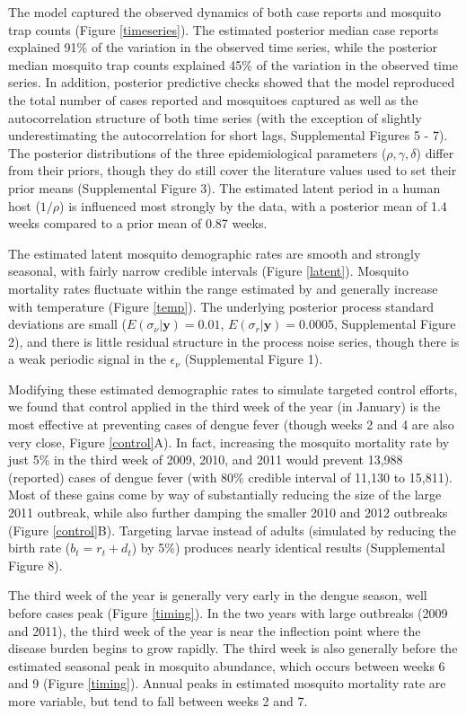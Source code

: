 \documentclass[10pt,letterpaper]{article}
\begin{document}
The model captured the observed dynamics of both case reports and mosquito trap counts (Figure \ref{timeseries}).
The estimated posterior median case reports explained 91\% of the variation in the observed time series, while the posterior median mosquito trap counts explained 45\% of the variation in the observed time series. 
In addition, posterior predictive checks showed that the model reproduced the total number of cases reported and mosquitoes captured as well as the autocorrelation structure of both time series (with the exception of slightly underestimating the autocorrelation for short lags, Supplemental Figures 5 - 7).
The posterior distributions of the three epidemiological parameters ($\rho, \gamma, \delta$) differ from their priors, though they do still cover the literature values used to set their prior means (Supplemental Figure 3).
The estimated latent period in a human host ($1/\rho$) is influenced most strongly by the data, with a posterior mean of 1.4 weeks compared to a prior mean of 0.87 weeks.

The estimated latent mosquito demographic rates are smooth and strongly seasonal, with fairly narrow credible intervals (Figure \ref{latent}).
Mosquito mortality rates fluctuate within the range estimated by \cite{Brady2013} and generally increase with temperature (Figure \ref{temp}).
The underlying posterior process standard deviations are small ($E(\sigma_{\nu}|\mathbf{y}) = 0.01$, $E(\sigma_r|\mathbf{y}) = 0.0005$, Supplemental Figure 2), and there is little residual structure in the process noise series, though there is a weak periodic signal in the $\epsilon_{\nu}$ (Supplemental Figure 1).

Modifying these estimated demographic rates to simulate targeted control efforts, we found that control applied in the third week of the year (in January) is the most effective at preventing cases of dengue fever (though weeks 2 and 4 are also very close, Figure \ref{control}A).
In fact, increasing the mosquito mortality rate by just 5\% in the third week of 2009, 2010, and 2011 would prevent 13,988 (reported) cases of dengue fever (with 80\% credible interval of 11,130 to 15,811).
Most of these gains come by way of substantially reducing the size of the large 2011 outbreak, while also further damping the smaller 2010 and 2012 outbreaks (Figure \ref{control}B).
Targeting larvae instead of adults (simulated by reducing the birth rate ($b_t = r_t + d_t$) by 5\%) produces nearly identical results (Supplemental Figure 8).

The third week of the year is generally very early in the dengue season, well before cases peak (Figure \ref{timing}).
In the two years with large outbreaks (2009 and 2011), the third week of the year is near the inflection point where the disease burden begins to grow rapidly.  
The third week is also generally before the estimated seasonal peak in mosquito abundance, which occurs between weeks 6 and 9 (Figure \ref{timing}).
Annual peaks in estimated mosquito mortality rate are more variable, but tend to fall between weeks 2 and 7.
\end{document}

